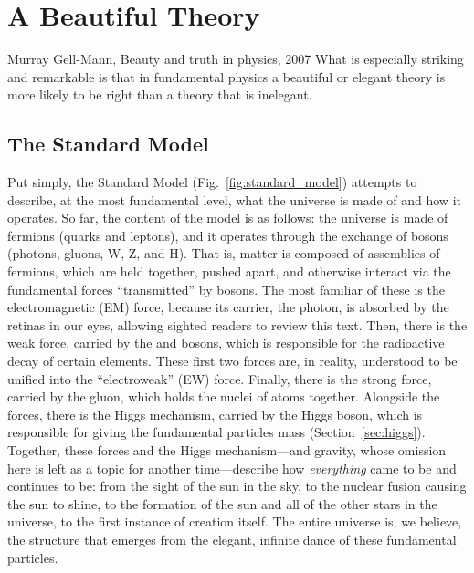 \chapter{A Beautiful Theory}
\begin{aquote}{Murray Gell-Mann, Beauty and truth in physics, 2007}
    What is especially striking and remarkable is that in fundamental physics 
    a beautiful or elegant theory is more likely to be right 
    than a theory that is inelegant.
\end{aquote}

\section{The Standard Model}
Put simply, the Standard Model (Fig.~\ref{fig:standard_model}) attempts to describe, at the most fundamental level, what the universe is made of and how it operates. 
So far, the content of the model is as follows: the universe is made of fermions (quarks and leptons), and it operates through the exchange of bosons (photons, gluons, W, Z, and H). 
That is, matter\footnotemark{} is composed of assemblies of fermions, which are held together, pushed apart, and otherwise interact via the fundamental forces ``transmitted'' by bosons. 
The most familiar of these is the electromagnetic (EM) force, because its carrier, the photon, is absorbed by the retinas in our eyes, allowing sighted readers to review this text. 
Then, there is the weak force, carried by the \PW and \PZ bosons, which is responsible for the radioactive decay of certain elements. 
These first two forces are, in reality, understood to be unified into the ``electroweak'' (EW) force. 
Finally, there is the strong force, carried by the gluon, which holds the nuclei of atoms together. 
Alongside the forces, there is the Higgs mechanism, carried by the Higgs boson, which is responsible for giving the fundamental particles mass (Section~\ref{sec:higgs}). 
Together, these forces and the Higgs mechanism---and gravity, whose omission here is left as a topic for another time---describe how \textit{everything} came to be and continues to be: from the sight of the sun in the sky, to the nuclear fusion causing the sun to shine, to the formation of the sun and all of the other stars in the universe, to the first instance of creation itself. 
The entire universe is, we believe, the structure that emerges from the elegant, infinite dance of these fundamental particles. 

